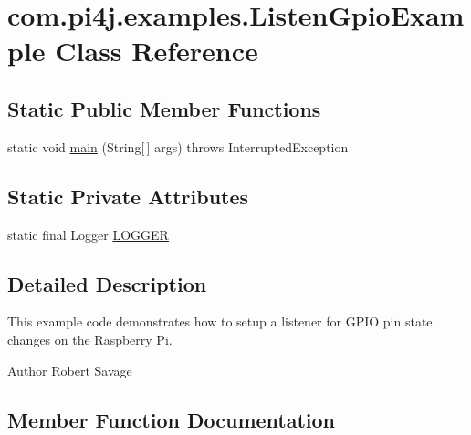 \hypertarget{classcom_1_1pi4j_1_1examples_1_1ListenGpioExample}{}\section{com.\+pi4j.\+examples.\+Listen\+Gpio\+Example Class Reference}
\label{classcom_1_1pi4j_1_1examples_1_1ListenGpioExample}
\subsection*{Static Public Member Functions}
\begin{DoxyCompactItemize}
\item 
static void \hyperlink{classcom_1_1pi4j_1_1examples_1_1ListenGpioExample_af151921c77a802d79eaeb99dca17f99a}{main} (String\mbox{[}$\,$\mbox{]} args)  throws Interrupted\+Exception 
\end{DoxyCompactItemize}
\subsection*{Static Private Attributes}
\begin{DoxyCompactItemize}
\item 
static final Logger \hyperlink{classcom_1_1pi4j_1_1examples_1_1ListenGpioExample_aff41cf086d718e409d352e9e88ba4523}{L\+O\+G\+G\+E\+R}
\end{DoxyCompactItemize}


\subsection{Detailed Description}
This example code demonstrates how to setup a listener for G\+P\+I\+O pin state changes on the Raspberry Pi.

\begin{DoxyAuthor}{Author}
Robert Savage 
\end{DoxyAuthor}


\subsection{Member Function Documentation}
\hypertarget{classcom_1_1pi4j_1_1examples_1_1ListenGpioExample_af151921c77a802d79eaeb99dca17f99a}{}
